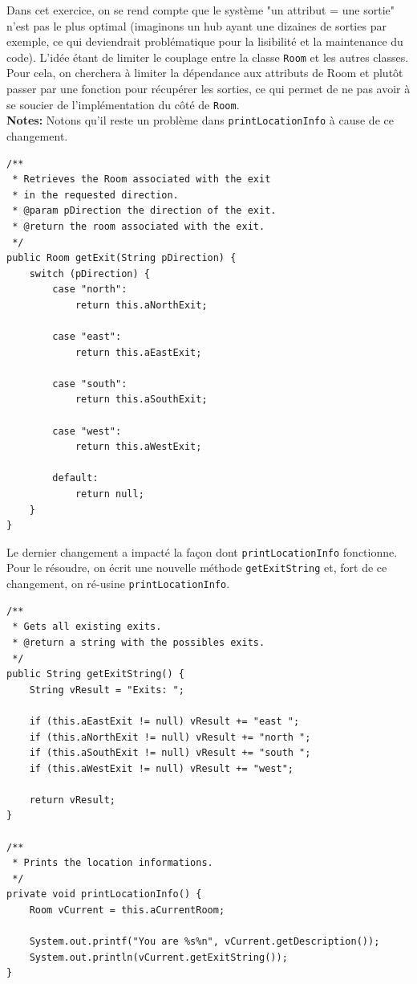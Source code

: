 \documentclass[a4paper,12pt]{report}
\begin{document}
\vfill

\begin{exercise}[subtitle=getExit]

Dans cet exercice, on se rend compte que le système "un attribut = une sortie" n'est pas le plus optimal (imaginons un hub ayant une dizaines de sorties par exemple, ce qui deviendrait problématique pour la lisibilité et la maintenance du code). L'idée étant de limiter le couplage entre la classe \verb|Room| et les autres classes. Pour cela, on cherchera à limiter la dépendance aux attributs de Room et plutôt passer par une fonction pour récupérer les sorties, ce qui permet de ne pas avoir à se soucier de l'implémentation du côté de \verb|Room|.\\ 

\textbf{Notes:} Notons qu'il reste un problème dans \verb|printLocationInfo| à cause de ce changement.

\vfill

\begin{verbatim}
/**
 * Retrieves the Room associated with the exit
 * in the requested direction.
 * @param pDirection the direction of the exit.
 * @return the room associated with the exit.
 */
public Room getExit(String pDirection) {
    switch (pDirection) {
        case "north":
            return this.aNorthExit;

        case "east":
            return this.aEastExit;

        case "south":
            return this.aSouthExit;

        case "west":
            return this.aWestExit;

        default:
            return null;
    }
}
\end{verbatim}

\end{exercise}

\vfill

\begin{exercise}[subtitle=getExitString]
Le dernier changement a impacté la façon dont \verb|printLocationInfo| fonctionne. Pour le résoudre, on écrit une nouvelle méthode \verb|getExitString| et, fort de ce changement, on ré-usine \verb|printLocationInfo|.

\begin{verbatim}
/**
 * Gets all existing exits.
 * @return a string with the possibles exits.
 */
public String getExitString() {
    String vResult = "Exits: ";

    if (this.aEastExit != null) vResult += "east ";
    if (this.aNorthExit != null) vResult += "north ";
    if (this.aSouthExit != null) vResult += "south ";
    if (this.aWestExit != null) vResult += "west";

    return vResult;
}

/**
 * Prints the location informations.
 */
private void printLocationInfo() {
    Room vCurrent = this.aCurrentRoom;

    System.out.printf("You are %s%n", vCurrent.getDescription());
    System.out.println(vCurrent.getExitString());
}
\end{verbatim}
\end{exercise}
\end{document}

